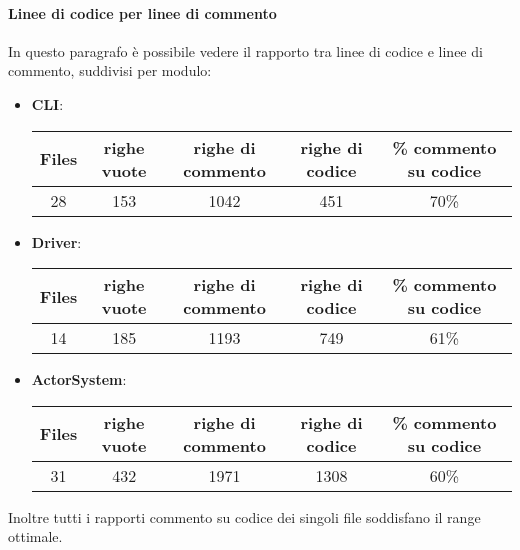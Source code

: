 \documentclass{scalatekids-article}
\begin{document}
\paragraph{Linee di codice per linee di commento}
In questo paragrafo è possibile vedere il rapporto tra linee di codice e
linee di commento, suddivisi per modulo:
\begin{itemize}
	
	\item \textbf{CLI}:
	\begin{center}
		\begin{tabular}{| c | c | c | c | c |}
			\hline
			Files & righe vuote & righe di commento & righe di codice & \% commento su codice\\
			\hline
			28 & 153 & 1042 & 451 & 70\% \\
			\hline
		\end{tabular}
	\end{center}
	
	\item \textbf{Driver}:
	\begin{center}
		\begin{tabular}{| c | c | c | c | c |}
			\hline
			Files & righe vuote & righe di commento & righe di codice & \% commento su codice\\
			\hline
			14 & 185 & 1193 & 749 & 61\% \\
			\hline
		\end{tabular}
	\end{center}
	
	\item \textbf{ActorSystem}:
	\begin{center}
		\begin{tabular}{| c | c | c | c | c |}
			\hline
			Files & righe vuote & righe di commento & righe di codice & \% commento su codice\\
			\hline
			31 & 432 & 1971 & 1308 & 60\% \\
			\hline
		\end{tabular}
	\end{center}
\end{itemize}

Inoltre tutti i rapporti commento su codice dei singoli file soddisfano il range ottimale.
\end{document}
